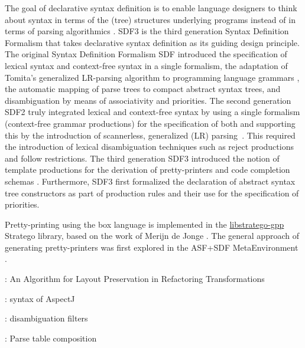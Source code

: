 The goal of declarative syntax definition is to enable language designers to
think about syntax in terms of the (tree) structures underlying programs instead
of in terms of parsing algorithmics \cite{KatsVW10}.
SDF3 is the third generation Syntax Definition Formalism that takes declarative
syntax definition as its guiding design principle.
The original Syntax Definition Formalism SDF \cite{HeeringHKR89} introduced the
specification of lexical syntax and context-free syntax in a single formalism,
the adaptation of Tomita's generalized LR-parsing algorithm to programming
language grammars \cite{Rekers1992,Tomita85}, the automatic mapping of parse
trees to compact abstract syntax trees, and disambiguation by means of
associativity and priorities.
The second generation SDF2 truly integrated lexical and context-free syntax by
using a single formalism (context-free grammar productions) for the
specification of both \cite{Vis97.thesis,Visser-1997-SDF} and supporting this by
the introduction of scannerless, generalized (LR) parsing~\cite{Vis97.sglr}.
This required the introduction of lexical disambiguation techniques such as
reject productions and follow restrictions. The third generation SDF3 introduced
the notion of template productions for the derivation of pretty-printers and code completion schemas \cite{VollebregtKV12}.
Furthermore, SDF3 first formalized the declaration of abstract syntax tree
constructors as part of production rules and their use for the specification of
priorities.


Pretty-printing using the box language is implemented in the
\href{http://releases.strategoxt.org/docs/api/libstratego-gpp/stable/docs/}{libstratego-gpp}
Stratego library, based on the work of Merijn de Jonge \cite{Jonge02}. The
general approach of generating pretty-printers was first explored in the ASF+SDF
MetaEnvironment \cite{BV94,BrandV96}.

\cite{JongeV11}: An Algorithm for Layout Preservation in Refactoring
Transformations

\cite{BravenboerTV06}: syntax of AspectJ

\cite{KlintV94,BrandSVV02}: disambiguation filters


\cite{BravenboerV08}: Parse table composition
